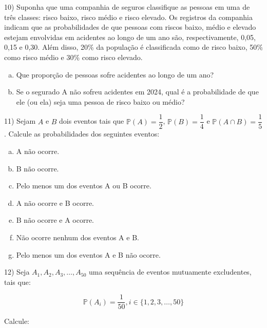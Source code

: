 \documentclass{article}
\begin{document}
10) Suponha que uma companhia de seguros classifique as pessoas em uma de três classes: risco baixo, risco médio e risco elevado.
Os registros da companhia indicam que as probabilidades de que pessoas com riscos baixo, médio e elevado estejam envolvidas 
em acidentes ao longo de um ano são, respectivamente, 0,05, 0,15 e 0,30. Além disso, 20\% da população é classificada como de risco baixo,
50\% como risco médio e 30\% como risco elevado.

\begin{enumerate}[a)]
    \item Que proporção de pessoas sofre acidentes ao longo de um ano?
    \item Se o segurado A não sofreu acidentes em 2024, qual é a probabilidade de que ele (ou ela) seja uma pessoa de risco baixo ou médio?
\end{enumerate}

\vspace{5px}

11) Sejam $A$ e $B$ dois eventos tais que $\mathds{P}(A) = \dfrac{1}{2}$, $\mathds{P}(B) = \dfrac{1}{4}$ e $\mathds{P}(A\cap B) = \dfrac{1}{5}$. Calcule as probabilidades dos seguintes eventos:

\begin{enumerate}[a)]
    \item A não ocorre.
    \item B não ocorre.
    \item Pelo menos um dos eventos A ou B ocorre.
    \item A não ocorre e B ocorre.
    \item B não ocorre e A ocorre.
    \item Não ocorre nenhum dos eventos A e B.
    \item Pelo menos um dos eventos A e B não ocorre.
\end{enumerate}

\vspace{5px}

12) Seja $A_1, A_2, A_3, \dots, A_{50}$ uma sequência de eventos mutuamente excludentes, tais que:

$$\mathds{P}(A_i) = \dfrac{1}{50}, i \in \{1, 2, 3, \dots, 50 \}$$

Calcule:
\end{document}
